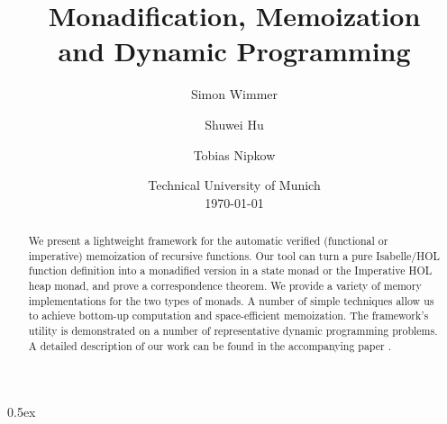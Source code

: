 \documentclass[11pt,a4paper]{article}
\begin{document}
\title{Monadification, Memoization\\ and Dynamic Programming}
\author{Simon Wimmer \and Shuwei Hu \and Tobias Nipkow}
\date{Technical University of Munich\\[\baselineskip] \today}
\maketitle

\begin{abstract}
We present a lightweight framework for the
automatic  verified  (functional  or  imperative)  memoization  of  recursive functions.
Our tool can turn a pure Isabelle/HOL function definition into a monadified version
in a state monad or the Imperative HOL heap monad, and prove a correspondence theorem.
We provide a variety of memory implementations for the two types of monads.
A number of simple techniques allow us to achieve bottom-up computation
and space-efficient memoization.
The framework's utility is demonstrated on a number of representative dynamic programming problems.
A detailed description of our work can be found in the accompanying paper \cite{DP-ITP-2018}.
\end{abstract}

\tableofcontents

\pagebreak

\parindent 0pt\parskip 0.5ex



%


\end{document}
